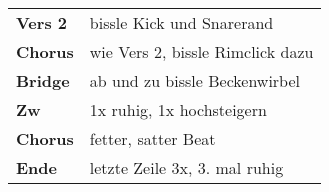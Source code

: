 
\begin{tabular}{p{1.6cm}l}
	\textbf{Vers 2} & bissle Kick und Snarerand        \\
	\textbf{Chorus} & wie Vers 2, bissle Rimclick dazu \\
	\textbf{Bridge} & ab und zu bissle Beckenwirbel    \\
	\textbf{Zw}     & 1x ruhig, 1x hochsteigern        \\
	\textbf{Chorus} & fetter, satter Beat              \\
	\textbf{Ende}   & letzte Zeile 3x, 3. mal ruhig    \\
\end{tabular}

